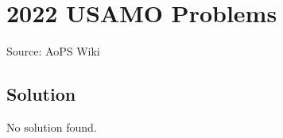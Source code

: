 \documentclass[12pt]{article}
\begin{document}
\section*{{2022 USAMO Problems}}
Source: AoPS Wiki

\subsection*{Solution}
No solution found.
\end{document}
